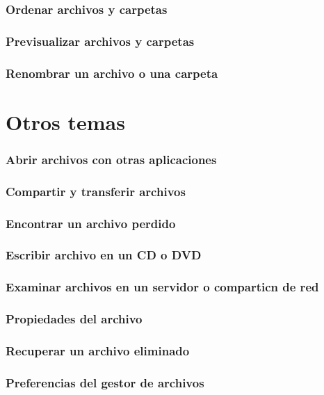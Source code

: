 \subsubsection{Ordenar archivos y carpetas}
\subsubsection{Previsualizar archivos y carpetas}
\subsubsection{Renombrar un archivo o una carpeta}
\section{Otros temas}
\subsubsection{Abrir archivos con otras aplicaciones}
\subsubsection{Compartir y transferir archivos}
\subsubsection{Encontrar un archivo perdido}
\subsubsection{Escribir archivo en un CD o DVD}
\subsubsection{Examinar archivos en un servidor o comparticn de red}%
\subsubsection{Propiedades del archivo}
\subsubsection{Recuperar un archivo eliminado}
\subsubsection{Preferencias del gestor de archivos}

